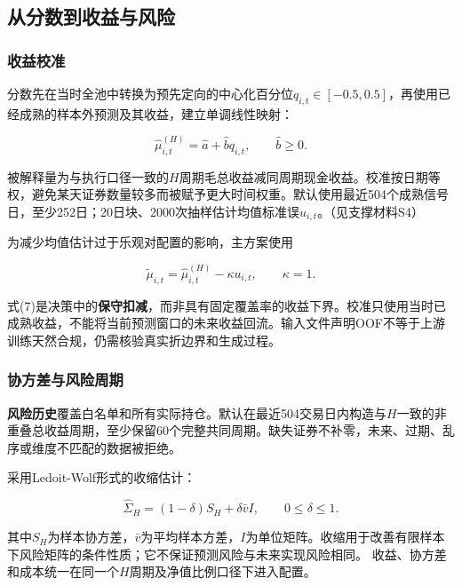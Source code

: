 \documentclass[UTF8,12pt,a4paper,fontset=none]{ctexart}
\begin{document}
\subsection{从分数到收益与风险}

\subsubsection{收益校准}

分数先在当时全池中转换为预先定向的中心化百分位$q_{i,t}\in[-0.5,0.5]$，再使用已经成熟的样本外预测及其收益，建立单调线性映射：


\begin{equation}
 \widehat\mu_{i,t}^{(H)}=\widehat a+\widehat b q_{i,t},\qquad \widehat b\geq0. \tag{6}
\end{equation}

被解释量为与执行口径一致的$H$周期毛总收益减同周期现金收益。校准按日期等权，避免某天证券数量较多而被赋予更大时间权重。默认使用最近504个成熟信号日，至少252日；20日块、2000次抽样估计均值标准误$u_{i,t}$。（见支撑材料S4）


为减少均值估计过于乐观对配置的影响，主方案使用


\begin{equation}
 \widetilde\mu_{i,t}=\widehat\mu_{i,t}^{(H)}-\kappa u_{i,t},\qquad \kappa=1. \tag{7}
\end{equation}

式(7)是决策中的\textbf{保守扣减}，而非具有固定覆盖率的收益下界。校准只使用当时已成熟收益，不能将当前预测窗口的未来收益回流。输入文件声明OOF不等于上游训练天然合规，仍需核验真实折边界和生成过程。


\subsubsection{协方差与风险周期}

\textbf{风险历史}覆盖白名单和所有实际持仓。默认在最近504交易日内构造与$H$一致的非重叠总收益周期，至少保留60个完整共同周期。缺失证券不补零，未来、过期、乱序或维度不匹配的数据被拒绝。


采用Ledoit-Wolf形式的收缩估计：


\begin{equation}
 \widehat\Sigma_H=(1-\delta)S_H+\delta\bar v I,\qquad 0\leq\delta\leq1. \tag{8}
\end{equation}

其中$S_H$为样本协方差，$\bar v$为平均样本方差，$I$为单位矩阵。收缩用于改善有限样本下风险矩阵的条件性质；它不保证预测风险与未来实现风险相同。\cite{r2} 收益、协方差和成本统一在同一个$H$周期及净值比例口径下进入配置。
\end{document}
